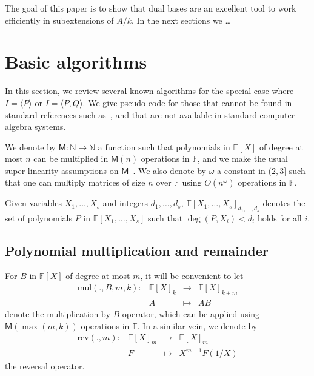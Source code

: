 \documentclass[12pt]{article}
\def\M {\ensuremath{\mathsf{M}}}
\def\N {\ensuremath{\mathbb{N}}}
\def\F {\ensuremath{\mathbb{F}}}
\def\mul {\ensuremath{\mathrm{mul}}}
\def\rev {\ensuremath{\mathrm{rev}}}
\newcommand{\ang}[1]{\langle#1\rangle}
\begin{document}
The goal of this paper is to show that dual bases are an excellent
tool to work efficiently in subextensions of $A/k$. In the next
sections we \dots %


\section{Basic algorithms}

In this section, we review several known algorithms for the special
case where $I=\ang{P}$ or $I=\ang{P,Q}$. We give
pseudo-code for those that cannot be found in standard references such
as~\cite{vzGG}, and that are not available in standard computer
algebra systems.

We denote by $\M:\N \to \N$ a function such that polynomials in
$\F[X]$ of degree at most $n$ can be multiplied in $\M(n)$ operations
in $\F$, and we make the usual super-linearity assumptions on
$\M$~\cite[Chapter~8]{vzGG}. We also denote by $\omega$ a constant in
$(2,3]$ such that one can multiply matrices of size $n$ over $\F$
using $O(n^\omega)$ operations in $\F$.

Given variables $X_1,\dots,X_s$ and integers $d_1,\dots,d_s$,
$\F[X_1,\dots,X_s]_{d_1,\dots,d_s}$ denotes the set of polynomials $P$
in $\F[X_1,\dots,X_s]$ such that $\deg(P,X_i) < d_i$ holds for all
$i$.


\subsection{Polynomial multiplication and remainder}

For $B$ in $\F[X]$ of degree at most $m$, it will be convenient to let
$$
\begin{array}{cccc}
\mul(.,B,m,k): &\F[X]_k& \to &\F[X]_{k+m}\\
& A & \mapsto & AB
\end{array}$$ 
denote the multiplication-by-$B$ operator, which can be applied using
$\M(\max(m,k))$ operations in $\F$. In a similar vein, we denote by
$$
\begin{array}{cccc}
\rev(.,m): &\F[X]_m &\to& \F[X]_m  \\
& F & \mapsto & X^{m-1} F(1/X)
\end{array}$$ the reversal operator. 
\end{document}
